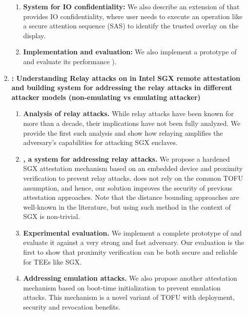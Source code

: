\begin{enumerate}
\begin{enumerate}
        \item \textbf{System for IO confidentiality:} We also describe an extension of \protection that provides IO confidentiality, where user needs to execute an operation like a secure attention sequence (SAS) to identify the trusted overlay on the display.
        
        \item \textbf{Implementation and evaluation:} We also implement a prototype of \protection and evaluate its performance ).
    \end{enumerate}
    
    \item \textbf{\proximitee: Understanding Relay attacks on in Intel SGX remote attestation and building system for addressing the relay attacks in different attacker models (non-emulating vs emulating attacker)}
    
    \begin{enumerate}
        \item \textbf{Analysis of relay attacks.} While relay attacks have been known for more than a decade, their implications have not been fully analyzed. We provide the first such analysis and show how relaying amplifies the adversary's capabilities for attacking SGX enclaves.   

        \item \textbf{\proximitee, a system for addressing relay attacks.} We propose a hardened SGX attestation mechanism based on an embedded device and proximity verification to prevent relay attacks. \proximitee does not rely on the common TOFU assumption, and hence, our solution improves the security of previous attestation approaches. Note that the distance bounding approaches are well-known in the literature, but using such method in the context of SGX is non-trivial.
    
        \item \textbf{Experimental evaluation.} We implement a complete prototype of \proximitee and evaluate it against a very strong and fast adversary. Our evaluation is the first to show that proximity verification can be both secure and reliable for TEEs like SGX.
    
        \item \textbf{Addressing emulation attacks.} We also propose another attestation mechanism based on boot-time initialization to prevent emulation attacks. This mechanism is a novel variant of TOFU with deployment, security and revocation benefits.
    \end{enumerate}
    

\end{enumerate}
